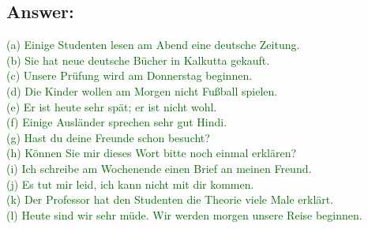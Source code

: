 \documentclass[a4paper,12pt]{article}
\begin{document}
\vspace{0.5cm}

\subsection*{Answer:}
\textcolor{darkgreen}
{(a) Einige Studenten lesen am Abend eine deutsche Zeitung.}\\
\textcolor{darkgreen}
{(b) Sie hat neue deutsche Bücher in Kalkutta gekauft.}\\
\textcolor{darkgreen}
{(c) Unsere Prüfung wird am Donnerstag beginnen.}\\
\textcolor{darkgreen}
{(d) Die Kinder wollen am Morgen nicht Fußball spielen.}\\
\textcolor{darkgreen}
{(e) Er ist heute sehr spät; er ist nicht wohl.}\\
\textcolor{darkgreen}
{(f) Einige Ausländer sprechen sehr gut Hindi.}\\
\textcolor{darkgreen}
{(g) Hast du deine Freunde schon besucht?}\\
\textcolor{darkgreen}
{(h) Können Sie mir dieses Wort bitte noch einmal erklären?}\\
\textcolor{darkgreen}
{(i) Ich schreibe am Wochenende einen Brief an meinen Freund.}\\
\textcolor{darkgreen}
{(j) Es tut mir leid, ich kann nicht mit dir kommen.}\\
\textcolor{darkgreen}
{(k) Der Professor hat den Studenten die Theorie viele Male erklärt.}\\
\textcolor{darkgreen}
{(l) Heute sind wir sehr müde. Wir werden morgen unsere Reise beginnen.}\\
\end{document}
